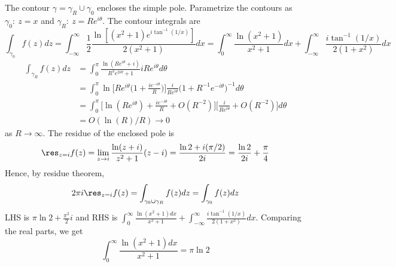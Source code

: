\documentclass[a4paper]{article}
\begin{document}
\begin{ans}
\begin{enumerate}[label=(\roman*)]
\begin{center}
  \end{center}
The contour $\gamma=\gamma_R\cup\gamma_0$ encloses the simple pole. Parametrize the contours as $\gamma_0:~z=x$ and $\gamma_R:~z=Re^{i\theta}$. The contour integrals are
$$\int_{\gamma_0}f(z)dz=\int_{-\infty}^\infty\frac{1}{2}\frac{\ln[(x^2+1)e^{i\tan^{-1}(1/x)}]}{2(x^2+1)}dx=\int_0^\infty\frac{\ln(x^2+1)}{x^2+1}dx+\int_{-\infty}^\infty\frac{i\tan^{-1}(1/x)}{2(1+x^2)}dx$$
\begin{align}
\int_{\gamma_R}f(z)dz&=\int_0^\pi\frac{\ln(Re^{i\theta}+i)}{R^2e^{2i\theta}+1}iRe^{i\theta}d\theta\nonumber\\&=\int_0^\pi\ln\bigg[Re^{i\theta}\bigg(1+\frac{ie^{-i\theta}}{R}\bigg)\bigg]\frac{i}{Re^{i\theta}}\bigg(1+R^{-1}e^{-i\theta}\bigg)^{-1}d\theta\nonumber\\&=\int_0^\pi\bigg[\ln(Re^{i\theta})+\frac{ie^{-i\theta}}{R}+O(R^{-2})\bigg]\bigg[\frac{i}{Re^{i\theta}}+O(R^{-2})\bigg]d\theta\nonumber\\&=O(\ln(R)/R)\rightarrow0\nonumber
\end{align}
as $R\rightarrow\infty$. The residue of the enclosed pole is
$$\res_{z=i}f(z)=\lim_{z\rightarrow i}\frac{\ln(z+i)}{z^2+1}(z-i)=\frac{\ln2+i(\pi/2)}{2i}=\frac{\ln 2}{2i}+\frac{\pi}{4}$$
Hence, by residue theorem,
$$2\pi i\res_{z=i}f(z)=\int_{\gamma_0\cup\gamma_R}f(z)dz=\int_{\gamma_0}f(z)dz$$
LHS is $\pi \ln 2+\frac{\pi^2}{2}i$ and RHS is $\int_0^\infty\frac{\ln(x^2+1)dx}{x^2+1}+\int_{-\infty}^\infty\frac{i\tan^{-1}(1/x)}{2(1+x^2)}dx$. Comparing the real parts, we get
$$\int_0^\infty\frac{\ln(x^2+1)dx}{x^2+1}=\pi \ln 2$$
\end{enumerate}
\end{ans}
\end{document}
